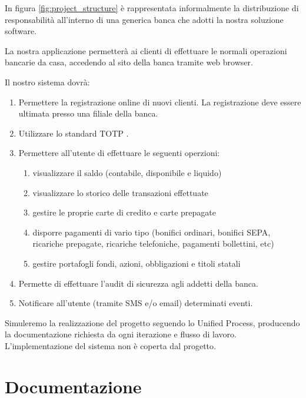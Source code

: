 \documentclass[]{softeng}
\begin{document}
In figura \ref{fig:project_structure} \`e rappresentata informalmente la distribuzione di responsabilit\`a all'interno di una generica banca che adotti la nostra soluzione software.

La nostra applicazione permetter\`a ai clienti di effettuare le normali operazioni bancarie da casa, accedendo al sito della banca tramite web browser.

Il nostro sistema dovr\`a:
\begin{enumerate}
	\item Permettere la registrazione online di nuovi clienti.
		La registrazione deve essere ultimata presso una filiale della banca.
	\item Utilizzare lo standard TOTP \cite{totprfc}.
	\item Permettere all'utente di effettuare le seguenti operzioni:
		\begin{enumerate}
			\item visualizzare il saldo (contabile, disponibile e liquido)
			\item visualizzare lo storico delle transazioni effettuate
			\item gestire le proprie carte di credito e carte prepagate
			\item disporre pagamenti di vario tipo (bonifici ordinari, bonifici SEPA, ricariche prepagate, ricariche telefoniche, pagamenti bollettini, etc)
			\item gestire portafogli fondi, azioni, obbligazioni e titoli statali %
		\end{enumerate}
	\item Permette di effettuare l'audit di sicurezza agli addetti della banca.
	\item Notificare all'utente (tramite SMS e/o email) determinati eventi.
\end{enumerate}

Simuleremo la realizzazione del progetto seguendo lo Unified Process, producendo la documentazione richiesta da ogni iterazione e flusso di lavoro.
L'implementazione del sistema non \`e coperta dal progetto.

\section{Documentazione}
\end{document}
